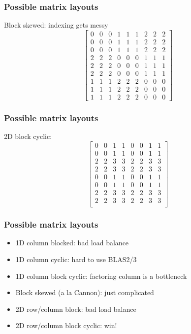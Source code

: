 \documentclass{beamer}
\begin{document}
\begin{frame}
  \frametitle{Possible matrix layouts}

  Block skewed: indexing gets messy
  \[
  \begin{bmatrix}
    0 & 0 & 0 & 1 & 1 & 1 & 2 & 2 & 2 \\
    0 & 0 & 0 & 1 & 1 & 1 & 2 & 2 & 2 \\
    0 & 0 & 0 & 1 & 1 & 1 & 2 & 2 & 2 \\
    2 & 2 & 2 & 0 & 0 & 0 & 1 & 1 & 1 \\
    2 & 2 & 2 & 0 & 0 & 0 & 1 & 1 & 1 \\
    2 & 2 & 2 & 0 & 0 & 0 & 1 & 1 & 1 \\
    1 & 1 & 1 & 2 & 2 & 2 & 0 & 0 & 0 \\
    1 & 1 & 1 & 2 & 2 & 2 & 0 & 0 & 0 \\
    1 & 1 & 1 & 2 & 2 & 2 & 0 & 0 & 0 
  \end{bmatrix}
  \]
\end{frame}


\begin{frame}
  \frametitle{Possible matrix layouts}

  2D block cyclic:
  \[
  \begin{bmatrix}
    0 & 0 & 1 & 1 & 0 & 0 & 1 & 1 \\
    0 & 0 & 1 & 1 & 0 & 0 & 1 & 1 \\
    2 & 2 & 3 & 3 & 2 & 2 & 3 & 3 \\
    2 & 2 & 3 & 3 & 2 & 2 & 3 & 3 \\
    0 & 0 & 1 & 1 & 0 & 0 & 1 & 1 \\
    0 & 0 & 1 & 1 & 0 & 0 & 1 & 1 \\
    2 & 2 & 3 & 3 & 2 & 2 & 3 & 3 \\
    2 & 2 & 3 & 3 & 2 & 2 & 3 & 3 \\
  \end{bmatrix}
  \]
\end{frame}



\begin{frame}
  \frametitle{Possible matrix layouts}

  \begin{itemize}
  \item 1D column blocked: bad load balance
  \item 1D column cyclic: hard to use BLAS2/3
  \item 1D column block cyclic: factoring column is a bottleneck
  \item Block skewed (a la Cannon): just complicated
  \item 2D row/column block: bad load balance
  \item 2D row/column block cyclic: win!
  \end{itemize}
\end{frame}
\end{document}
